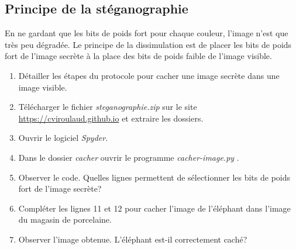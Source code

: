 \documentclass[a4paper,11pt]{article}
\begin{document}
\begin{Form}
\section{Principe de la stéganographie}
En ne gardant que les bits de poids fort pour chaque couleur, l'image n'est que très peu dégradée. Le principe de la dissimulation est de placer les bits de poids fort de l'image secrète à la place des bits de poids faible de l'image visible.
\begin{center}
\label{stegano}
\end{center}
\begin{activite}
\begin{enumerate}
\item Détailler les étapes du protocole pour cacher une image secrète dans une image visible.
\item Télécharger le fichier \emph{steganographie.zip} sur le site \url{https://cviroulaud.github.io}  et extraire les dossiers.
\item Ouvrir le logiciel \emph{Spyder}.
\item Dans le dossier \emph{cacher} ouvrir le programme \emph{cacher-image.py} .
\item Observer le code. Quelles lignes permettent de sélectionner les bits de poids fort de l'image secrète?
\item Compléter les lignes 11 et 12 pour cacher l'image de l'éléphant dans l'image du magasin de porcelaine.
\item Observer l'image obtenue. L'éléphant est-il correctement caché?
\end{enumerate} 
\end{activite}

\end{Form}
\end{document}
